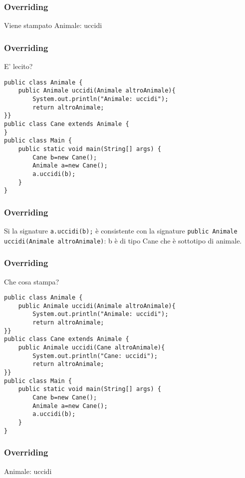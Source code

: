 \documentclass{beamer}
\begin{document}
\begin{frame}[fragile]
\frametitle{Overriding}
\begin{framed}
Viene stampato Animale: uccidi
\end{framed}
\end{frame}

\begin{frame}[fragile]
\frametitle{Overriding}
\begin{framed}
E' lecito?
\begin{lstlisting}
public class Animale {
    public Animale uccidi(Animale altroAnimale){
        System.out.println("Animale: uccidi");
        return altroAnimale;
}}
public class Cane extends Animale {
}
public class Main {
    public static void main(String[] args) {
        Cane b=new Cane();
        Animale a=new Cane();
        a.uccidi(b);
    }
}
\end{lstlisting}
\end{framed}
\end{frame}

\begin{frame}[fragile]
\frametitle{Overriding}
\begin{framed}
Si la signature \texttt{a.uccidi(b);} \`e consistente con la signature
 \texttt{public Animale uccidi(Animale altroAnimale)}: b \`e di tipo Cane che \`e sottotipo di animale.
\end{framed}
\end{frame}

\begin{frame}[fragile]
\frametitle{Overriding}
\begin{framed}
Che cosa stampa?
\begin{lstlisting}
public class Animale {
    public Animale uccidi(Animale altroAnimale){
        System.out.println("Animale: uccidi");
        return altroAnimale;
}}
public class Cane extends Animale {
    public Animale uccidi(Cane altroAnimale){
        System.out.println("Cane: uccidi");
        return altroAnimale;
}}
public class Main {
    public static void main(String[] args) {
        Cane b=new Cane();
        Animale a=new Cane();
        a.uccidi(b);
    }
}
\end{lstlisting}
\end{framed}
\end{frame}

\begin{frame}[fragile]
\frametitle{Overriding}
\begin{framed}
Animale: uccidi
\end{framed}
\end{frame}
\end{document}
